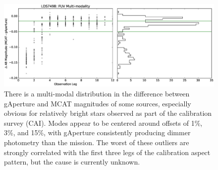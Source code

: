 \documentclass[preprint]{aastex}
\begin{document}
\begin{figure}
\includegraphics[scale=0.55]{Fig11.eps}
\caption{There is a multi-modal distribution in the difference between gAperture and MCAT magnitudes of some sources, especially obvious for relatively bright stars observed as part of the calibration survey (CAI). Modes appear to be centered around offsets of 1\%, 3\%, and 15\%, with gAperture consistently producing dimmer photometry than the mission. The worst of these outliers are strongly correlated with the first three legs of the calibration aspect pattern, but the cause is currently unknown.
\label{ldslegs}}
\end{figure}
\end{document}
